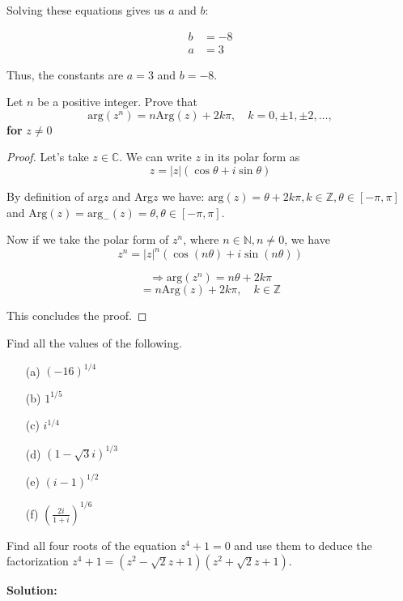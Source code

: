 Solving these equations gives us \( a \) and \( b \):

\begin{align*}
b &= -8 \\
a &= 3
\end{align*}

Thus, the constants are \( a = 3 \) and \( b = -8 \).

\begin{exercise}
    Let \( n \) be a positive integer. Prove that \[ \text{arg}(z^n) = n \text{Arg}(z) + 2k\pi, \quad k = 0, \pm1, \pm2, \ldots, \]
    \textbf{for} \( z \neq 0 \)
\end{exercise}
\begin{proof}
    Let's take \( z \in \mathbb{C} \). We can write \( z \) in its polar form as
\[ z = |z|(\cos \theta + i \sin \theta) \]

By definition of arg\( z \) and Arg\( z \) we have: \( \text{arg}(z) = \theta + 2k\pi, k \in \mathbb{Z}, \theta \in [-\pi, \pi] \) and \( \text{Arg}(z) = \text{arg}_{-}(z) = \theta, \theta \in [-\pi, \pi] \).

Now if we take the polar form of \( z^n \), where \( n \in \mathbb{N}, n \neq 0 \), we have
\[ z^n = |z|^n(\cos(n\theta) + i \sin(n\theta)) \]

\[ \Rightarrow \text{arg}(z^n) = n\theta + 2k\pi \]
\[ = n\text{Arg}(z) + 2k\pi, \quad k \in \mathbb{Z} \]

This concludes the proof.
\end{proof}

\begin{exercise}
    Find all the values of the following.
    \begin{enumerate}
        \item[(a)] \( (-16)^{1/4} \)
        \item[(b)] \( 1^{1/5} \)
        \item[(c)] \( i^{1/4} \)
        \item[(d)] \( (1 - \sqrt{3}i)^{1/3} \)
        \item[(e)] \( (i - 1)^{1/2} \)
        \item[(f)] \( \left(\frac{2i}{1+i}\right)^{1/6} \)
    \end{enumerate}
\end{exercise}



\begin{exercise}
    Find all four roots of the equation \( z^4 + 1 = 0 \) and use them to deduce the factorization \( z^4 + 1 = (z^2 - \sqrt{2}z + 1)(z^2 + \sqrt{2}z + 1) \).
\end{exercise}
\textbf{Solution:}

